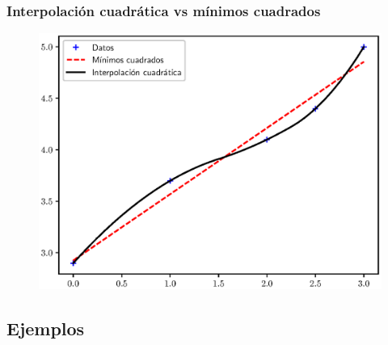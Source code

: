 \documentclass[12pt]{beamer}
\begin{document}
\begin{frame}[fragile]
\frametitle{Interpolación cuadrática vs mínimos cuadrados}
\vspace{-0.25cm}
\begin{figure}
    \centering
    \includegraphics[scale=0.6]{Imagenes/Intro_Interpolacion_003.eps}
\end{figure}
\end{frame}

\subsection*{Ejemplos}
\end{document}
